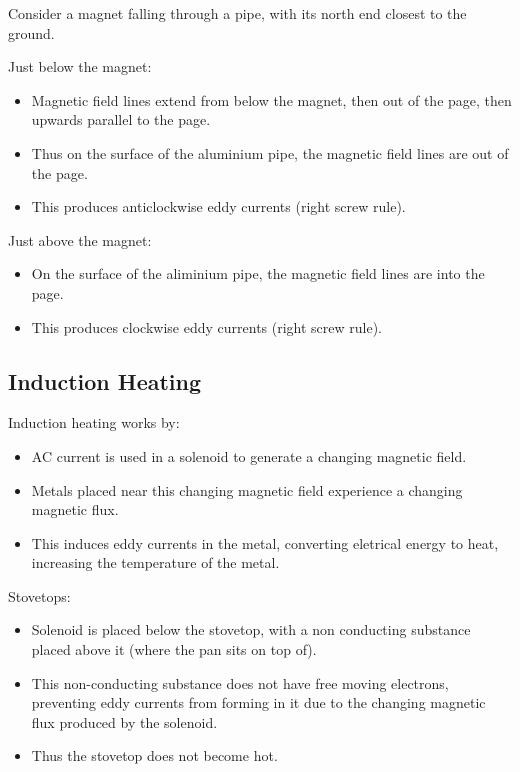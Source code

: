 \documentclass[a4paper,11pt]{article}
\begin{document}
Consider a magnet falling through a pipe, with its north end closest to the
ground.

Just below the magnet:

\begin{itemize}
\item Magnetic field lines extend from below the magnet, then out of the page,
	then upwards parallel to the page.
\item Thus on the surface of the aluminium pipe, the magnetic field lines
	are out of the page.
\item This produces anticlockwise eddy currents (right screw rule).
\end{itemize}

Just above the magnet:

\begin{itemize}
\item On the surface of the aliminium pipe, the magnetic field lines are into
	the page.
\item This produces clockwise eddy currents (right screw rule).
\end{itemize}


\subsection{Induction Heating}

Induction heating works by:

\begin{itemize}
\item AC current is used in a solenoid to generate a changing magnetic field.
\item Metals placed near this changing magnetic field experience a changing
	magnetic flux.
\item This induces eddy currents in the metal, converting eletrical energy to
	heat, increasing the temperature of the metal.
\end{itemize}

Stovetops:

\begin{itemize}
\item Solenoid is placed below the stovetop, with a non conducting substance
	placed above it (where the pan sits on top of).
\item This non-conducting substance does not have free moving electrons,
	preventing eddy currents from forming in it due to the changing magnetic
	flux produced by the solenoid.
\item Thus the stovetop does not become hot.
\end{itemize}
\end{document}
